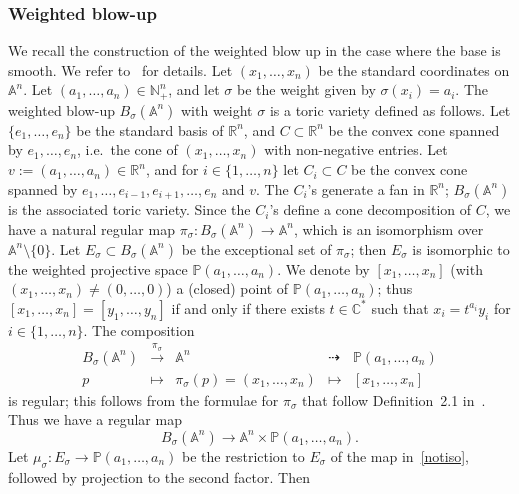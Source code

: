 \documentclass[11pt]{amsart}
\numberwithin{equation}{section}
\theoremstyle{plain}
\theoremstyle{remark}
\theoremstyle{definition}
\newcommand\aff{{\mathbb A}}
\newcommand{\CC}{{\mathbb C}}
\newcommand{\dra}{\dashrightarrow}
\newcommand{\lra}{\longrightarrow}
\newcommand{\NN}{{\mathbb N}}
\newcommand{\PP}{{\mathbb P}}
\newcommand{\RR}{{\mathbb R}}
\begin{document}
\subsubsection{Weighted blow-up}\label{subsubsec:monomideal}
%
We recall the construction of the weighted blow up in the case where the base is smooth. We refer to~\cite{kollmori3flips,andblow} for details. Let $(x_1,\ldots,x_n)$ be the standard coordinates on $\aff^n$. Let $(a_1,\ldots,a_n)\in \NN_{+}^n$, and let $\sigma$ be the weight given by $\sigma(x_i)=a_i$. The weighted blow-up $B_{\sigma}(\aff^n)$ with weight $\sigma$ is  a toric variety defined as follows. Let $\{e_1,\ldots,e_n\}$ be the standard basis of $\RR^n$, and $C\subset\RR^n$ be the convex cone spanned by $e_1,\ldots,e_n$, i.e.~the cone of $(x_1,\ldots,x_n)$ with non-negative entries. Let $v:=(a_1,\ldots,a_n)\in\RR^n$, and for $i\in\{1,\ldots,n\}$ let $C_i\subset C$ be the convex cone spanned by $e_1,\ldots,e_{i-1},e_{i+1},\ldots,e_n$ and $v$.  The $C_i$'s generate a fan in $\RR^n$; $B_{\sigma}(\aff^n)$  is the associated toric variety. Since the $C_i$'s define a cone decomposition of $C$, we have a natural regular map $\pi_{\sigma}\colon B_{\sigma}(\aff^n)\to\aff^n$, which is an isomorphism over $\aff^n\setminus\{0\}$.  Let $E_{\sigma}\subset B_{\sigma}(\aff^n)$ be the exceptional set of $\pi_{\sigma}$; then $E_{\sigma}$ is isomorphic to the weighted projective space $\PP(a_1,\ldots,a_n)$. We denote by $[x_1,\ldots,x_n]$ (with $(x_1,\ldots,x_n)\not=(0,\ldots,0)$) a (closed) point of $\PP(a_1,\ldots,a_n)$; thus  $[x_1,\ldots,x_n]=[y_1,\ldots,y_n]$  if and only if there exists $t\in\CC^{*}$ such that $x_i=t^{a_i}y_i$ for  $i\in\{1,\ldots,n\}$. The composition
%
\begin{equation*}
%
\begin{matrix}
%
B_{\sigma}(\aff^n) & \overset{\pi_{\sigma}}{\lra} &  \aff^n & \dra & \PP(a_1,\ldots,a_n) \\
%
p & \mapsto & \pi_{\sigma}(p)=(x_1,\ldots,x_n) & \mapsto & [x_1,\ldots,x_n]
%
\end{matrix}
%
%
\end{equation*}
%
is regular; this follows from the formulae for $\pi_{\sigma}$ that follow Definition~2.1 in~\cite{andblow}. Thus we have a regular map 
%
%
\begin{equation}\label{notiso}
%
B_{\sigma}(\aff^n) \lra \aff^n\times \PP(a_1,\ldots,a_n).
%
\end{equation}
%
Let  $\mu_{\sigma}\colon E_{\sigma}\to  \PP(a_1,\ldots,a_n)$ be the restriction to $E_{\sigma}$ of the map in~\eqref{notiso}, followed by projection to the second factor. Then  
\end{document}
